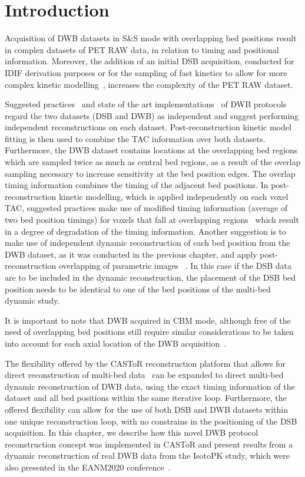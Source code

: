 \section{Introduction}
Acquisition of DWB datasets in S\&S mode with overlapping bed positions result in complex datasets of PET RAW data, in relation to timing and positional information. Moreover, the addition of an initial DSB acquisition, conducted for IDIF derivation purposes or for the sampling of fast kinetics to allow for more complex kinetic modelling~\cite{Zaker2020}, increases the complexity of the PET RAW dataset. 

Suggested practices~\cite{Karakatsanis2013} and state of the art implementations~\cite{Hu2020} of DWB protocols regard the two datasets (DSB and DWB) as independent and suggest performing independent reconstructions on each dataset. Post-reconstruction kinetic model fitting is then used to combine the TAC information over both datasets. 
Furthermore, the DWB dataset contains locations at the overlapping bed regions which are sampled twice as much as central bed regions, as a result of the overlap sampling necessary to increase sensitivity at the bed position edges. The overlap timing information combines the timing of the adjacent bed positions. In post-reconstruction kinetic modelling, which is applied independently on each voxel TAC, suggested practices make use of modified timing information (average of two bed position timings) for voxels that fall at overlapping regions~\cite{Karakatsanis2013} which result in a degree of degradation of the timing information. Another suggestion is to make use of independent dynamic reconstruction of each bed position from the DWB dataset, as it was conducted in the previous chapter, and apply post-reconstruction overlapping of parametric images ~\cite{Karakatsanis2016a}. In this case if the DSB data are to be included in the dynamic reconstruction, the placement of the DSB bed position needs to be identical to one of the bed positions of the multi-bed dynamic study.

It is important to note that DWB acquired in CBM mode, although free of the need of overlapping bed positions still require similar considerations to be taken into account for each axial location of the DWB acquisition~\cite{Karakatsanis2016b,Hu2020}.

The flexibility offered by the CASToR reconstruction platform that allows for direct reconstruction of multi-bed data~\cite{Ross2004} can be expanded to direct multi-bed dynamic reconstruction of DWB data, using the exact timing information of the dataset and all bed positions within the same iterative loop. Furthermore, the offered flexibility can allow for the use of both DSB and DWB datasets within one unique reconstruction loop, with no constrains in the positioning of the DSB acquisition.
In this chapter, we describe how this novel DWB protocol reconstruction concept was implemented in CASToR and present results from a dynamic reconstruction of real DWB data from the IsotoPK study, which were also presented in the EANM2020 conference~\cite{chalampalakis2020EANM}.


